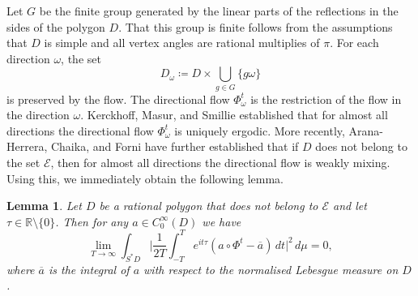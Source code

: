 \documentclass[10pt,a4paper]{amsart}
\newcommand{\R}{\mathbb{R}}
\newcommand{\1}{\mathrm{\mathbf{1}}}
\numberwithin{equation}{section}
\newtheorem{lemma}[thm]{Lemma}
\begin{document}
Let $G$ be the finite group generated by the linear parts of the reflections in the sides of the polygon $D$. That this group is finite follows from the assumptions that $D$ is simple and all vertex angles are rational multiplies of $\pi$. For each direction $\omega$, the set
\begin{equation*}
    D_\omega \coloneqq D\times \bigcup_{g\in G} \{g\omega\} 
\end{equation*}
is preserved by the flow. The directional flow $\Phi^t_{\omega}$ is the restriction of the flow in the direction $\omega$. Kerckhoff, Masur, and Smillie \cite{MR855297} established that for almost all directions the directional flow $\Phi^t_{\omega}$ is uniquely ergodic. More recently, Arana-Herrera, Chaika, and Forni \cite{aranaherrera2024weakmixingrationalbilliards} have further established that if $D$ does not belong to the set $\mathcal{E}$, then for almost all directions the directional flow is weakly mixing. Using this, we immediately obtain the following lemma.
%
\begin{lemma}\label{LE:consequence_weak_mixing}
    Let $D$ be a rational polygon that does not belong to $\mathcal{E}$ and let $\tau\in\R\setminus\{0\}$. Then for any $a\in C_0^\infty(D)$ we have
    \begin{equation*}
        \lim_{T\rightarrow \infty} \int_{S^*D} \bigg| \frac{1}{2T} \int_{-T}^{T} e^{it\tau} (  a\circ\Phi^t - \overline{a}) \, dt \bigg|^2 \, d\mu = 0,
    \end{equation*}
    where $\overline{a}$ is the integral of $a$ with respect to the normalised Lebesgue measure on $D$.
\end{lemma}
\end{document}
